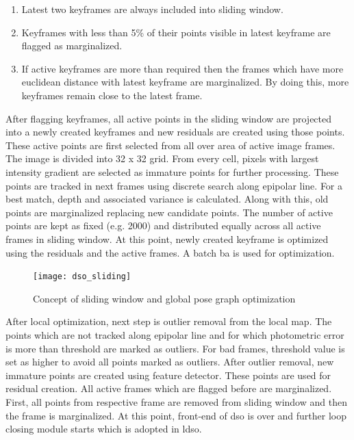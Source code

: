 \begin{enumerate}
	\item Latest two keyframes are always included into sliding window.
	\item Keyframes with less than 5\% of their points visible in latest keyframe are flagged as marginalized.  
	\item If active keyframes are more than required then the frames which have more euclidean distance with latest keyframe are marginalized. By doing this, more keyframes remain close to the latest frame. 
\end{enumerate}
After flagging keyframes, all active points in the sliding window are projected into a newly created keyframes and new residuals are created using those points. These active points are first selected from all over area of active image frames. The image is divided into 32 x 32 grid. From every cell, pixels with largest intensity gradient are selected as immature points for further processing. These points are tracked in next frames using discrete search along epipolar line. For a best match, depth and associated variance is calculated. Along with this, old points are marginalized replacing new candidate points. The number of active points are kept as fixed (e.g. 2000) and distributed equally across all active frames in sliding window. At this point, newly created keyframe is optimized using the residuals and the active frames. A batch \acrshort{ba} is used for optimization.\\ 
\begin{figure}[h!]
	\centering
	\texttt{[image: dso\_sliding]}
	\caption{Concept of sliding window and global pose graph optimization \cite{gao2018ldso}}
	\label{fig:dso_sliding}
\end{figure}
\newline After local optimization, next step is outlier removal from the local map. The points which are not tracked along epipolar line and for which photometric error is more than threshold are marked as outliers. For bad frames, threshold value is set as higher to avoid all points marked as outliers. After outlier removal, new immature points are created using feature detector. These points are used for residual creation. All active frames which are flagged before are marginalized. First, all points from respective frame are removed from sliding window and then the frame is marginalized. At this point, front-end of \acrshort{dso} is over and further loop closing module starts which is adopted in \acrshort{ldso}.

